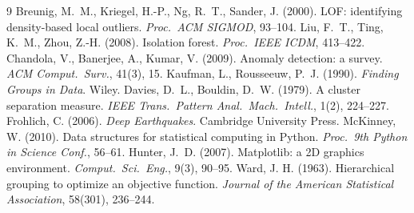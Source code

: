 \documentclass[a4paper,11pt]{article}
\begin{document}
\begin{thebibliography}{9}
 Breunig, M.\ M., Kriegel, H.-P., Ng, R.\ T., Sander, J. (2000). LOF: identifying density-based local outliers. \emph{Proc.\ ACM SIGMOD}, 93--104.
 Liu, F.\ T., Ting, K.\ M., Zhou, Z.-H. (2008). Isolation forest. \emph{Proc.\ IEEE ICDM}, 413--422.
 Chandola, V., Banerjee, A., Kumar, V. (2009). Anomaly detection: a survey. \emph{ACM Comput.\ Surv.}, 41(3), 15.
 Kaufman, L., Rousseeuw, P.\ J. (1990). \emph{Finding Groups in Data}. Wiley.
 Davies, D.\ L., Bouldin, D.\ W. (1979). A cluster separation measure. \emph{IEEE Trans.\ Pattern Anal.\ Mach.\ Intell.}, 1(2), 224--227.
 Frohlich, C. (2006). \emph{Deep Earthquakes}. Cambridge University Press.
 McKinney, W. (2010). Data structures for statistical computing in Python. \emph{Proc.\ 9th Python in Science Conf.}, 56--61.
 Hunter, J.\ D. (2007). Matplotlib: a 2D graphics environment. \emph{Comput.\ Sci.\ Eng.}, 9(3), 90--95.
 Ward, J. H. (1963). Hierarchical grouping to optimize an objective function. \textit{Journal of the American Statistical Association}, 58(301), 236--244.
\end{thebibliography}
\end{document}
